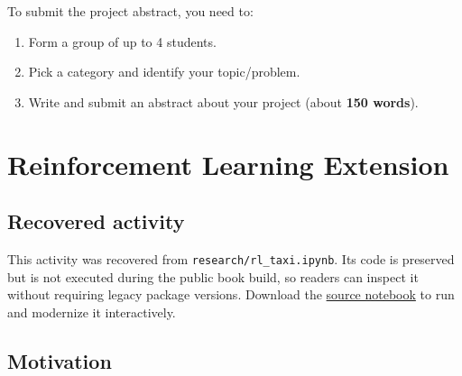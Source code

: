 \documentclass[
  letterpaper,
]{scrbook}
\providecommand{\tightlist}{%
  \setlength{\itemsep}{0pt}\setlength{\parskip}{0pt}}
\begin{document}

To submit the project abstract, you need to:

\begin{enumerate}
\def\labelenumi{\arabic{enumi}.}
\tightlist
\item
  Form a group of up to 4 students.
\item
  Pick a category and identify your topic/problem.
\item
  Write and submit an abstract about your project (about \textbf{150
  words}).
\end{enumerate}

\chapter*{Reinforcement Learning
Extension}\label{ch-lab-reinforcement-learning-extension}


\section*{Recovered
activity}\label{sec-lab-reinforcement-learning-extension}


\begin{tcolorbox}[enhanced jigsaw, arc=.35mm, bottomrule=.15mm, bottomtitle=1mm, breakable, colback=white, colbacktitle=quarto-callout-note-color!10!white, colframe=quarto-callout-note-color-frame, coltitle=black, left=2mm, leftrule=.75mm, opacityback=0, opacitybacktitle=0.6, rightrule=.15mm, title=\textcolor{quarto-callout-note-color}{\faInfo}\hspace{0.5em}{Historical source and execution note}, titlerule=0mm, toprule=.15mm, toptitle=1mm]

This activity was recovered from \texttt{research/rl\_taxi.ipynb}. Its
code is preserved but is not executed during the public book build, so
readers can inspect it without requiring legacy package versions.
Download the
\href{../notebooks/reinforcement-learning-extension.ipynb}{source
notebook} to run and modernize it interactively.

\end{tcolorbox}

\section*{Motivation}\label{motivation}
\end{document}
